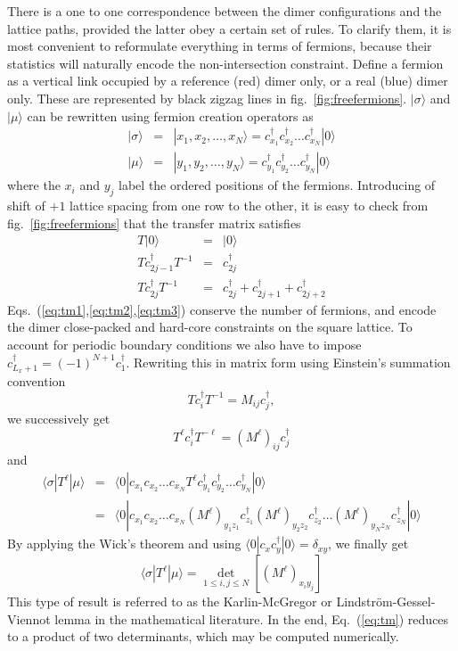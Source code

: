 \documentclass[11pt]{iopart}
\begin{document}
There is a one to one correspondence between the dimer configurations and the lattice paths, provided the latter obey a certain set of rules. To clarify them, it is most convenient to reformulate everything in terms of fermions, because their statistics will naturally encode the non-intersection constraint. 
Define a fermion as a vertical link occupied by a reference (red) dimer only, or a real (blue) dimer only. These are represented by black zigzag lines in fig.~\ref{fig:freefermions}. $|\sigma\rangle$ and $|\mu\rangle$ can be rewritten using fermion creation operators as
\begin{eqnarray}
|\sigma \rangle&=&|x_1,x_2,\ldots,x_N\rangle=c_{x_1}^\dag c_{x_2}^\dag \ldots c_{x_N}^\dag |0\rangle \\
|\mu \rangle&=&|y_1,y_2,\ldots,y_N\rangle=c_{y_1}^\dag c_{y_2}^\dag \ldots c_{y_N}^\dag |0\rangle
\end{eqnarray}
where the $x_i$ and $y_j$ label the ordered positions of the fermions. Introducing of shift of $+1$ lattice spacing from one row to the other, it is easy to check from fig.~\ref{fig:freefermions} that the transfer matrix satisfies
\begin{eqnarray}\label{eq:tm1}
T|0\rangle&=&|0\rangle\\\label{eq:tm2}
T c_{2j-1}^\dag T^{-1}&=&c_{2j}^\dag\\\label{eq:tm3}
T c_{2j}^\dag T^{-1}&=&c_{2j}^\dag+c_{2j+1}^\dag +c_{2j+2}^\dag
\end{eqnarray}
Eqs.~(\ref{eq:tm1},\ref{eq:tm2},\ref{eq:tm3}) conserve the number of fermions, and encode the dimer close-packed and hard-core constraints on the square lattice. To account for periodic boundary conditions  we also have to impose $c_{L_x+1}^\dag=(-1)^{N+1}c_1^\dag$. Rewriting this in matrix form using Einstein's summation convention
\begin{equation}
 T c_i^\dag T^{-1}=M_{ij} c_j^\dag,
\end{equation}
we successively get
\begin{equation}
 T^\ell c_i^\dag T^{-\ell}=\left(M^\ell\right)_{ij} c_j^\dag
\end{equation}
and 
\begin{eqnarray}
\langle \sigma |T^\ell |\mu\rangle&=&\langle 0|c_{x_1} c_{x_2} \ldots c_{x_N} T^{\ell} c_{y_1}^\dag c_{y_2}^\dag \ldots c_{y_N}^\dag |0\rangle \\ 
&=&\langle 0|c_{x_1} c_{x_2} \ldots c_{x_N} (M^\ell)_{y_1 z_1}c_{z_1}^\dag (M^\ell)_{y_2 z_2}c_{z_2}^\dag \ldots (M^\ell)_{y_N z_N}c_{z_N}^\dag|0\rangle
\end{eqnarray}
By applying the Wick's theorem and using $\langle 0|c_x c_y^\dag|0\rangle=\delta_{xy}$, we finally get
\begin{equation}
 \langle \sigma |T^\ell |\mu\rangle=\det_{1\leq i,j\leq N} \left[(M^\ell)_{x_i y_j}\right]
\end{equation}
This type of result is referred to as the Karlin-McGregor\cite{KarlinMcGregor} or Lindstr\"om-Gessel-Viennot\cite{Lindstrom1973,GesselViennot1989} lemma in the mathematical literature. In the end, Eq.~(\ref{eq:tm}) reduces to a product of two determinants, which may be computed numerically.
\clearpage
\end{document}
